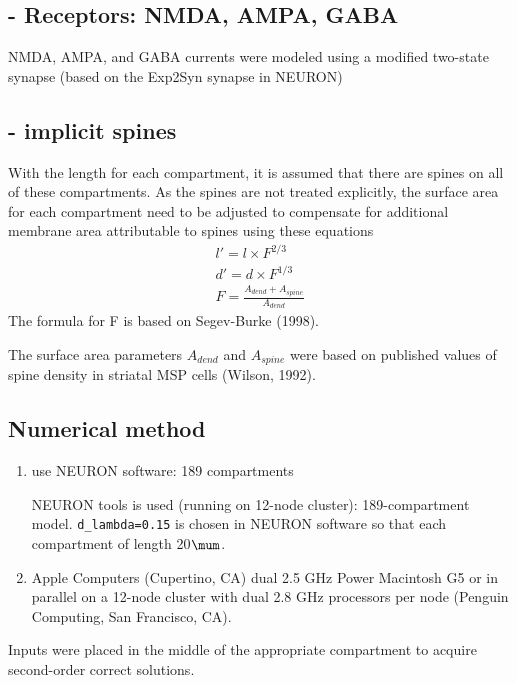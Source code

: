 \subsection{- Receptors: NMDA, AMPA, GABA}

NMDA, AMPA, and GABA currents were modeled
using a modified two-state synapse (based on the Exp2Syn synapse in NEURON)

\subsection{- implicit spines}

With the length for each compartment, it is assumed that there are spines on all
of these compartments. As the spines are not treated explicitly, the 
surface area for each compartment need to be adjusted to compensate for
additional membrane area attributable to spines using these equations
\begin{equation}
\begin{split}
l' = l \times F^{2/3} \\
d' = d \times F^{1/3} \\
F = \frac{A_{dend} + A_{spine}}{A_{dend}}
\end{split}
\end{equation}
The formula for F is based on Segev-Burke (1998).

The surface area parameters $A_{dend}$ and $A_{spine}$ were based on published
values of spine density in striatal MSP cells (Wilson, 1992).



\subsection{Numerical method}

\begin{enumerate}
  \item use NEURON software: 189 compartments
  
  NEURON tools is used (running on 12-node cluster): 189-compartment model.
\verb!d_lambda=0.15! is chosen in NEURON software so that each compartment of
length 20$\mum$.

  \item Apple Computers (Cupertino, CA) dual 2.5 GHz Power Macintosh G5 or in
  parallel on a 12-node cluster with dual 2.8 GHz processors per node (Penguin
  Computing, San  Francisco, CA).
\end{enumerate}


Inputs were placed in the middle of the appropriate compartment to
acquire second-order correct solutions.

